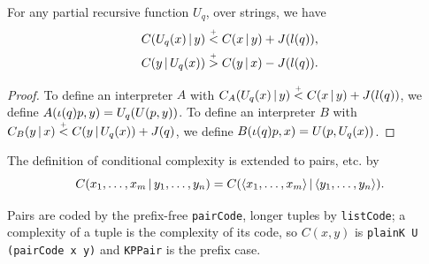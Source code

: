 \begin{theorem}
  \leanok
   \label{thm:rectransf}
 For any partial recursive function \( U_{q} \), over 
strings, we have
 \begin{align*} C(U_{q}(x) \,\vert\, y)	&\stackrel{{}_+}{<}  C(x \,\vert\, y) + J(l(q)),
  \\   C(y \,\vert\, U_{q}(x))	&\stackrel{{}_+}{>}  C(y \,\vert\, x) - J(l(q)).
 \end{align*}
\end{theorem}

\begin{proof}
  \leanok
 To define an interpreter \( A \) with \( C_A(U_{q}(x) \,\vert\, y) \stackrel{{}_+}{<} C(x \,\vert\, y )
+ J(l(q)) \), we define \( A(\iota(q)p,y) = U_{q}(U(p,y)) \). 
To define an
interpreter \( B \) with \( C_B(y \,\vert\, x) \stackrel{{}_+}{<} C(y \,\vert\, U_{q}(x)) + J(q) \), we
define \( B(\iota(q)p,x) = U(p,U_{q}(x)) \).
 \end{proof}

 \begin{definition}
  \label{def:pair-complexity}
  \leanok
The definition of conditional complexity is extended to pairs, etc. by 
 \[
 C(x_{1},\ldots,x_{m} \,\vert\, y_{1},\ldots, y_{n}) 
	= C({\mathopen\langle  x_{1},\ldots,x_{m}\mathclose\rangle}  \,\vert\, {\mathopen\langle  y_{1},\ldots,y_{n}\mathclose\rangle} ).
 \]
 \end{definition}
\begin{formalization}
Pairs are coded by the prefix-free \texttt{pairCode}, longer tuples by \texttt{listCode}; a complexity of a tuple is the complexity of its code, so $C(x,y)$ is \texttt{plainK U (pairCode x y)} and \texttt{KPPair} is the prefix case.
\end{formalization}


